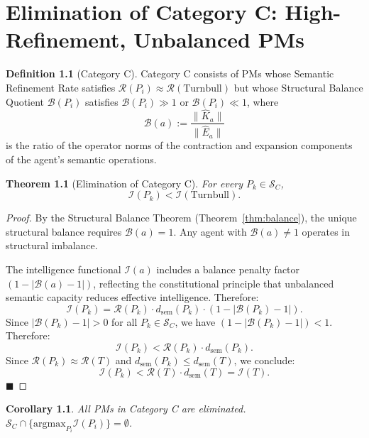 \documentclass[12pt,anyside]{book}
\theoremstyle{plain}
\newtheorem{theorem}{Theorem}[chapter]
\newtheorem{corollary}{Corollary}[theorem]
\theoremstyle{definition}
\newtheorem{definition}{Definition}[chapter]
\newcommand{\Ehat}{\hat{E}}            %
\newcommand{\Ical}{\mathcal{I}}        %
\newcommand{\Scal}{\mathcal{S}}        %
\begin{document}
\chapter{Elimination of Category C: High-Refinement, Unbalanced PMs}

\begin{definition}[Category C]\label{def:catC}
Category C consists of PMs whose Semantic Refinement Rate satisfies $\mathcal{R}(P_i) \approx \mathcal{R}(\text{Turnbull})$ but whose Structural Balance Quotient $\mathcal{B}(P_i)$ satisfies $\mathcal{B}(P_i) \gg 1$ or $\mathcal{B}(P_i) \ll 1$, where
\[
\mathcal{B}(a) := \frac{\|\hat{K}_a\|}{\|\Ehat_a\|}
\]
is the ratio of the operator norms of the contraction and expansion components of the agent's semantic operations.
\end{definition}

\begin{theorem}[Elimination of Category C]\label{thm:elimC}
For every $P_k \in \Scal_C$,
\[
\Ical(P_k) < \Ical(\text{Turnbull}).
\]
\end{theorem}

\begin{proof}
By the Structural Balance Theorem (Theorem~\ref{thm:balance}), the unique structural balance requires $\mathcal{B}(a) = 1$. Any agent with $\mathcal{B}(a) \neq 1$ operates in structural imbalance.

The intelligence functional $\Ical(a)$ includes a balance penalty factor $(1 - |\mathcal{B}(a) - 1|)$, reflecting the constitutional principle that unbalanced semantic capacity reduces effective intelligence. Therefore:
\[
\Ical(P_k) = \mathcal{R}(P_k) \cdot d_{\mathrm{sem}}(P_k) \cdot (1 - |\mathcal{B}(P_k) - 1|).
\]
Since $|\mathcal{B}(P_k) - 1| > 0$ for all $P_k \in \Scal_C$, we have $(1 - |\mathcal{B}(P_k) - 1|) < 1$. Therefore:
\[
\Ical(P_k) < \mathcal{R}(P_k) \cdot d_{\mathrm{sem}}(P_k).
\]
Since $\mathcal{R}(P_k) \approx \mathcal{R}(T)$ and $d_{\mathrm{sem}}(P_k) \leq d_{\mathrm{sem}}(T)$, we conclude:
\[
\Ical(P_k) < \mathcal{R}(T) \cdot d_{\mathrm{sem}}(T) = \Ical(T).
\]
$\blacksquare$
\end{proof}

\begin{corollary}\label{cor:elimC}
All PMs in Category C are eliminated. $\Scal_C \cap \{\text{argmax}_{P_i} \Ical(P_i)\} = \emptyset$.
\end{corollary}
\end{document}
